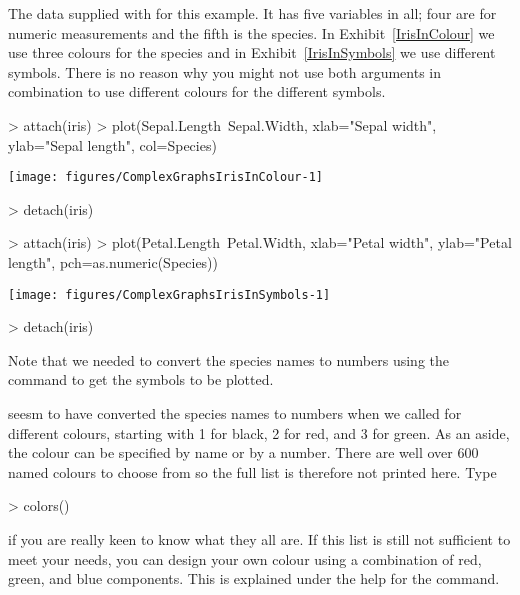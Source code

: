 The  data supplied with \R{} for this example. It has five variables in all; four are for numeric measurements and the fifth is the species. In Exhibit~\ref{IrisInColour} we use three colours for the species and in Exhibit~\ref{IrisInSymbols} we use different symbols. There is no reason why you might not use both arguments in combination to use different colours for the different symbols. 
 
\begin{exhibit} 
\begin{center} 
\caption{} 
\label{IrisInColour} 
\begin{Schunk}
\begin{Sinput}
> attach(iris) 
> plot(Sepal.Length~Sepal.Width, xlab="Sepal width", ylab="Sepal length", col=Species) 
\end{Sinput}

\texttt{[image: figures/ComplexGraphsIrisInColour-1]} \begin{Sinput}
> detach(iris) 
\end{Sinput}
\end{Schunk}
\end{center} 
\end{exhibit} 
 
\begin{exhibit} 
\begin{center} 
\caption{} 
\label{IrisInSymbols} 
\begin{Schunk}
\begin{Sinput}
> attach(iris) 
> plot(Petal.Length~Petal.Width, xlab="Petal width", ylab="Petal length", pch=as.numeric(Species)) 
\end{Sinput}

\texttt{[image: figures/ComplexGraphsIrisInSymbols-1]} \begin{Sinput}
> detach(iris) 
\end{Sinput}
\end{Schunk}
\end{center} 
\end{exhibit} 
Note that we needed to convert the species names to numbers using the  command to get the symbols to be plotted. 
 
\R{} seesm to have converted the species names to numbers when we called for different colours, starting with 1 for black, 2 for red, and 3 for green. As an aside, the colour can be specified by name or by a number. There are well over 600 named colours to choose from so the full list is therefore not printed here. Type 
\begin{Schunk}
\begin{Sinput}
> colors() 
\end{Sinput}
\end{Schunk}
if you are really keen to know what they all are. If this list is still not sufficient to meet your needs, you can design your own colour using a combination of red, green, and blue components. This is explained under the help for the  command. 
 
